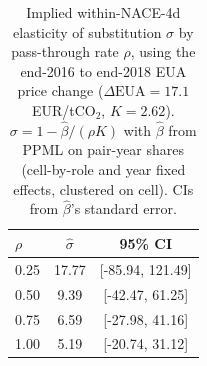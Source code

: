 \begin{table}[ht]
\centering
\caption{Implied within-NACE-4d elasticity of substitution $\sigma$ by pass-through rate $\rho$, using the end-2016 to end-2018 EUA price change ($\Delta\text{EUA} = 17.1$ EUR/tCO$_2$, $K = 2.62$). $\sigma = 1 - \hat\beta/(\rho K)$ with $\hat\beta$ from PPML on pair-year shares (cell-by-role and year fixed effects, clustered on cell). CIs from $\hat\beta$'s standard error.} 
\label{tab:phase4_within_intensive_ces_elasticity_sigma}
\begin{tabular}{lcc}
  \toprule
$\rho$ & $\hat\sigma$ & 95\% CI \\ 
  \midrule
0.25 & 17.77 & [-85.94, 121.49] \\ 
  0.50 & 9.39 & [-42.47, 61.25] \\ 
  0.75 & 6.59 & [-27.98, 41.16] \\ 
  1.00 & 5.19 & [-20.74, 31.12] \\ 
   \bottomrule
\end{tabular}
\end{table}
